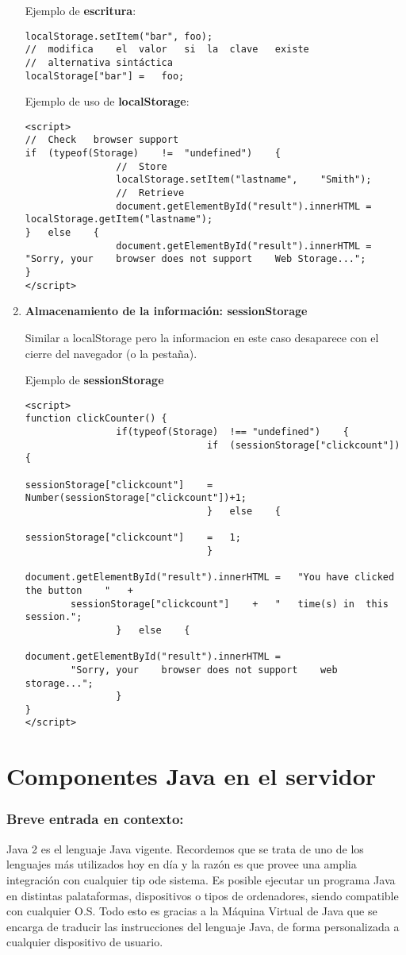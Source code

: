 \documentclass{apuntes}
\begin{document}
\begin{enumerate}
Ejemplo de \textbf{escritura}:
\begin{verbatim}
localStorage.setItem("bar",	foo);	
//	modifica	el	valor	si	la	clave	existe
//	alternativa sintáctica
localStorage["bar"]	=	foo;		
\end{verbatim}


Ejemplo de uso de \textbf{localStorage}:
\begin{verbatim}
<script>	
//	Check	browser	support
if	(typeof(Storage)	!=	"undefined")	{	
				//	Store
				localStorage.setItem("lastname",	"Smith");	
				//	Retrieve
				document.getElementById("result").innerHTML	=	
localStorage.getItem("lastname");	
}	else	{	
				document.getElementById("result").innerHTML	=		
"Sorry,	your	browser	does not support	Web	Storage...";	
}	
</script>
\end{verbatim}
	
\item \textbf{Almacenamiento de la información: sessionStorage}

Similar a localStorage pero la informacion en este caso desaparece con el cierre del navegador (o la pestaña).

Ejemplo de \textbf{ sessionStorage}
\begin{verbatim}
<script>	
function clickCounter()	{	
				if(typeof(Storage)	!==	"undefined")	{	
								if	(sessionStorage["clickcount"])	{	
												sessionStorage["clickcount"]	=	Number(sessionStorage["clickcount"])+1;	
								}	else	{	
												sessionStorage["clickcount"]	=	1;	
								}	
								document.getElementById("result").innerHTML	=	"You have clicked the button	"	+	
	 	sessionStorage["clickcount"]	+	"	time(s)	in	this session.";	
				}	else	{	
								document.getElementById("result").innerHTML	=		
	 	"Sorry,	your	browser	does not support	web	storage...";	
				}	
}	
</script>
\end{verbatim}	
\end{enumerate}

\section{Componentes Java en el servidor}
\subsubsection{Breve entrada en contexto: }
Java 2 es el lenguaje Java vigente. Recordemos que se trata de uno de los lenguajes más utilizados hoy en día y la razón es que provee una amplia integración con cualquier tip ode sistema. Es posible ejecutar un programa Java en distintas palataformas, dispositivos o tipos de ordenadores, siendo compatible con cualquier O.S. Todo esto es gracias a la Máquina Virtual de Java que se encarga de traducir las instrucciones del lenguaje Java, de forma personalizada a cualquier dispositivo de usuario. 
\end{document}
